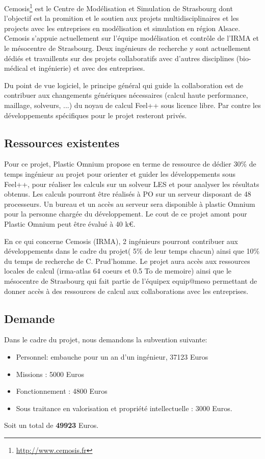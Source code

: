 \documentclass[12pt]{article}
\begin{document}
Cemosis\footnote{\url{http://www.cemosis.fr}} est le Centre de Modélisation et
Simulation de Strasbourg dont l'objectif est la promition et le soutien aux
projets multidisciplinaires et les projects avec les entreprises en modélisation
et simulation en région Alsace. Cemosis s'appuie actuellement sur l'équipe
modélisation et contrôle de l'IRMA et le mésocentre de Strasbourg. Deux
ingénieurs de recherche y sont actuellement dédiés et travaillents sur des
projets collaboratifs avec d'autres disciplines (bio-médical et ingénierie) et
avec des entreprises.

Du point de vue logiciel, le principe général qui guide la collaboration est de
contribuer aux changements génériques nécessaires (calcul haute performance,
maillage, solveurs, ...) du noyau de calcul Feel++ sous licence libre. Par
contre les développements spécifiques pour le projet resteront privés.

\subsection{Ressources existentes}

Pour ce projet, Plastic Omnium propose en terme de ressource de dédier 30\%
de temps ingénieur au projet pour orienter et guider les développements sous
Feel++, pour réaliser les calculs sur un solveur LES et pour analyser les
résultats obtenus. Les calculs pourront être réalisés à PO sur un serveur
disposant de 48 processeurs. Un bureau et un accès au serveur sera disponible à
plastic Omnium pour la personne chargée du développement. Le cout de ce projet
amont pour Plastic Omnium peut être évalué à 40 k€.

En ce qui concerne Cemosis (IRMA), 2 ingénieurs pourront contribuer aux
développements dans le cadre du projet( 5\% de leur temps chacun) ainsi que 10\%
du temps de recherche de C. Prud'homme. Le projet aura accès aux ressources
locales de calcul (irma-atlas 64 coeurs et 0.5 To de memoire) ainsi que le
mésocentre de Strasbourg qui fait partie de l'équipex equip@meso permettant de
donner accès à des ressources de calcul aux collaborations avec les entreprises.

\subsection{Demande}


Dans le cadre du projet, nous demandons la subvention suivante:
\begin{itemize}
\item Personnel: embauche pour un an d'un ingénieur, 37123 Euros
\item Missions : 5000 Euros
\item Fonctionnement  : 4800 Euros
\item Sous traitance en valorisation et propriété intellectuelle : 3000 Euros.
\end{itemize}
Soit un total de \textbf{49923} Euros.
\end{document}
